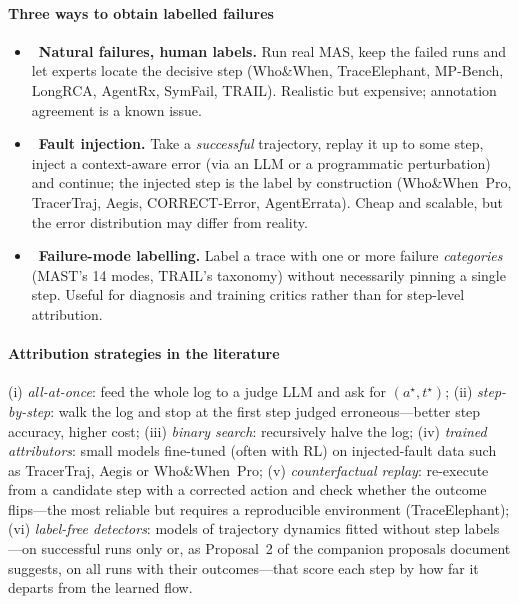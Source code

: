 \paragraph{Three ways to obtain labelled failures}
\begin{itemize}[leftmargin=1.1em]
\item \naturalbadge\ \textbf{Natural failures, human labels.} Run real MAS, keep the failed runs and let experts locate the decisive step (Who\&When, TraceElephant, MP-Bench, LongRCA, AgentRx, SymFail, TRAIL). Realistic but expensive; annotation agreement is a known issue.
\item \injected\ \textbf{Fault injection.} Take a \emph{successful} trajectory, replay it up to some step, inject a context-aware error (via an LLM or a programmatic perturbation) and continue; the injected step is the label by construction (Who\&When~Pro, TracerTraj, Aegis, CORRECT-Error, AgentErrata). Cheap and scalable, but the error distribution may differ from reality.
\item {}\ \textbf{Failure-mode labelling.} Label a trace with one or more failure \emph{categories} (MAST's 14 modes, TRAIL's taxonomy) without necessarily pinning a single step. Useful for diagnosis and training critics rather than for step-level attribution.
\end{itemize}

\paragraph{Attribution strategies in the literature} (i) \emph{all-at-once}: feed the whole log to a judge LLM and ask for $(a^\star,t^\star)$; (ii) \emph{step-by-step}: walk the log and stop at the first step judged erroneous---better step accuracy, higher cost; (iii) \emph{binary search}: recursively halve the log; (iv) \emph{trained attributors}: small models fine-tuned (often with RL) on injected-fault data such as TracerTraj, Aegis or Who\&When~Pro; (v) \emph{counterfactual replay}: re-execute from a candidate step with a corrected action and check whether the outcome flips---the most reliable but requires a reproducible environment (TraceElephant); (vi) \emph{label-free detectors}: models of trajectory dynamics fitted without step labels---on successful runs only \cite{yeh2026oat} or, as Proposal~2 of the companion proposals document suggests, on all runs with their outcomes---that score each step by how far it departs from the learned flow.
